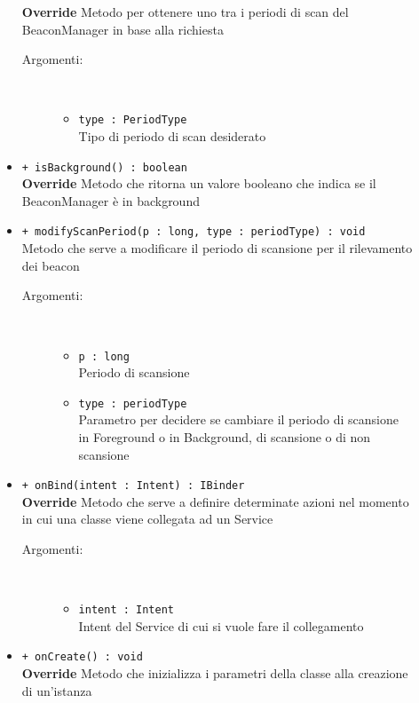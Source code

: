 \documentclass[../DefinizioneDiProdotto.tex]{subfiles}
\begin{document}
\begin{description}
\begin{itemize}
		\textbf{Override} Metodo per ottenere uno tra i periodi di scan del BeaconManager in base alla richiesta
		\begin{description}
			\item[Argomenti:] \
			\begin{itemize}
				\item \texttt{type : PeriodType}\\
				Tipo di periodo di scan desiderato\end{itemize}
		\end{description}
		\item \texttt{+ isBackground() : boolean}\\
		\textbf{Override} Metodo che ritorna un valore booleano che indica se il BeaconManager è in background
		\item \texttt{+ modifyScanPeriod(p : long, type : periodType) : void}\\
		Metodo che serve a modificare il periodo di scansione per il rilevamento dei beacon
		\begin{description}
			\item[Argomenti:] \
			\begin{itemize}
				\item \texttt{p : long}\\
				Periodo di scansione\item \texttt{type : periodType}\\
				Parametro per decidere se cambiare il periodo di scansione in Foreground o in Background, di scansione o di non scansione\end{itemize}
		\end{description}
		\item \texttt{+ onBind(intent : Intent) : IBinder}\\
		\textbf{Override} Metodo che serve a definire determinate azioni nel momento in cui una classe viene collegata ad un Service 
		\begin{description}
			\item[Argomenti:] \
			\begin{itemize}
				\item \texttt{intent : Intent}\\
				Intent del Service di cui  si vuole fare il collegamento  \end{itemize}
		\end{description}
		\item \texttt{+ onCreate() : void}\\
		\textbf{Override} Metodo che inizializza i parametri della classe alla creazione di un'istanza

\end{itemize}
\end{description}
\end{document}
